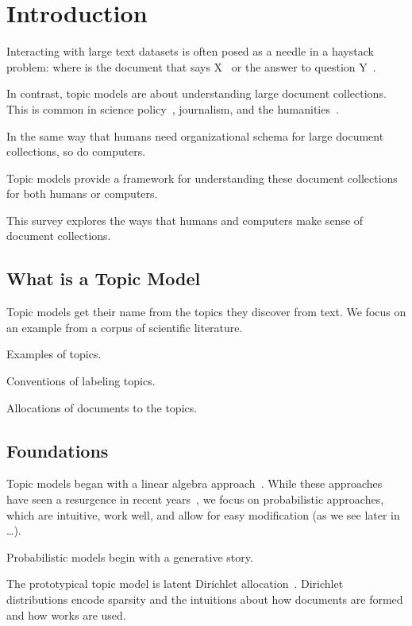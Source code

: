 
\chapter{Introduction}
\label{ch:intro}

Interacting with large text datasets is often posed as a needle in a
haystack problem: where is the document that says X~\citep{Salton-68} or the answer to
question Y~\citep{Hirschman-01}.

In contrast, topic models are about understanding large document
collections.  This is common in science policy~\citep{talley-11}, journalism, and the
humanities~\citep{moretti-13}.

In the same way that humans need organizational schema for large
document collections, so do computers.  

Topic models provide a framework for understanding these document
collections for both humans or computers.

This survey explores the ways that humans and computers make sense of
document collections.

\section{What is a Topic Model}

Topic models get their name from the topics they discover from text.
We focus on an example from a corpus of scientific literature.

Examples of topics.

Conventions of labeling topics.

Allocations of documents to the topics. 

\section{Foundations}

Topic models began with a linear algebra
approach~\citep{deerwester-90}.  While these approaches have seen a
resurgence in recent years~\citep{anandkumar-12:lda,arora-13}, we focus
on probabilistic approaches, which are intuitive, work well, and allow
for easy modification (as we see later in \dots).

Probabilistic models begin with a generative story.

The prototypical topic model is latent Dirichlet
allocation~\citep{blei-03}.  Dirichlet distributions encode sparsity
and the intuitions about how documents are formed and how works are
used.

